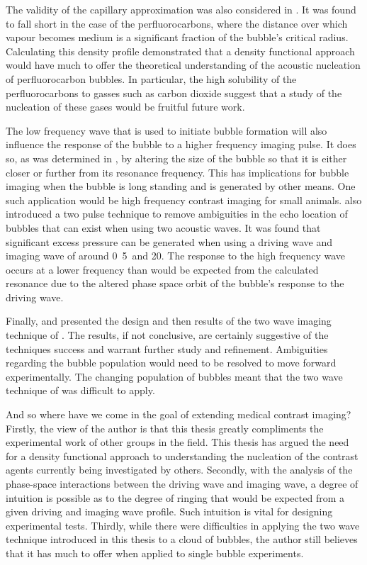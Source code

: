 The validity of the capillary approximation was also considered in .
It was found to fall short in the case of the perfluorocarbons, 
where the distance over which vapour becomes medium is a significant fraction of the bubble's critical radius.
Calculating this density profile demonstrated that a density functional approach would have much to offer
the theoretical understanding of the acoustic nucleation of perfluorocarbon bubbles.
In particular, 
the high solubility of the perfluorocarbons to gasses such as carbon dioxide suggest that a 
study of the nucleation of these gases would be fruitful future work.


The low frequency wave that is used to initiate bubble formation will also influence the response of the bubble to a higher frequency imaging pulse.
It does so, 
as was determined in ,
by altering the size of the bubble so that it is either closer or further from its resonance frequency.
This
has implications for bubble imaging when the bubble is long standing and is generated by other means.
One such application would be high frequency contrast imaging for small animals.
 also introduced a two pulse technique to remove ambiguities
in the echo location of bubbles that can exist when using two acoustic waves.
It was found that significant excess pressure can be generated when using a driving wave and imaging wave of around \unit{0.5}\mega\hertz\ and \unit{20}\mega\hertz.
The response to the high frequency wave occurs at a lower frequency than would be expected from the calculated resonance due to the altered phase space orbit of the bubble's response to the driving wave.

Finally,  and  presented the 
design  and then results of the two wave imaging technique of .
The results, if not conclusive, are certainly suggestive of the techniques success
and warrant further study and refinement. 
Ambiguities regarding the bubble population would need to be resolved to move forward experimentally.
The changing population of bubbles meant that the two wave technique of  was difficult to apply.

And so where have we come in the goal of extending medical contrast imaging?
Firstly, the view of the author is that this thesis greatly compliments the experimental work of other groups in the field.
This thesis has argued the need for a density functional approach to understanding the nucleation of the contrast agents currently being investigated by others.
Secondly, with the analysis of the phase-space interactions between the driving wave and imaging wave,
a degree of intuition is possible as to the degree of ringing that would be expected from a given driving and imaging wave profile.
Such intuition is vital for designing experimental tests.
Thirdly, while there were difficulties in applying the two wave technique introduced in this thesis to a cloud of bubbles,
the author still believes that it has much to offer when applied to single bubble experiments.


